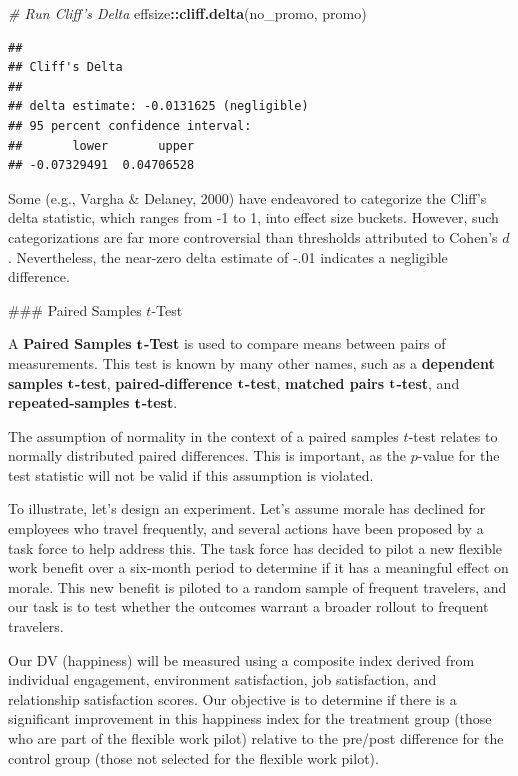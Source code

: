 \documentclass[]{book}
\newenvironment{Shaded}{\begin{snugshade}}{\end{snugshade}}
\newcommand{\CommentTok}[1]{\textcolor[rgb]{0.56,0.35,0.01}{\textit{#1}}}
\newcommand{\KeywordTok}[1]{\textcolor[rgb]{0.13,0.29,0.53}{\textbf{#1}}}
\newcommand{\NormalTok}[1]{#1}
\newcommand{\OperatorTok}[1]{\textcolor[rgb]{0.81,0.36,0.00}{\textbf{#1}}}
\begin{document}
\begin{Shaded}
\begin{Highlighting}[]
\CommentTok{# Run Cliff's Delta}
\NormalTok{effsize}\OperatorTok{::}\KeywordTok{cliff.delta}\NormalTok{(no_promo, promo)}
\end{Highlighting}
\end{Shaded}

\begin{verbatim}
## 
## Cliff's Delta
## 
## delta estimate: -0.0131625 (negligible)
## 95 percent confidence interval:
##       lower       upper 
## -0.07329491  0.04706528
\end{verbatim}

Some (e.g., Vargha \& Delaney, 2000) have endeavored to categorize the Cliff's delta statistic, which ranges from -1 to 1, into effect size buckets. However, such categorizations are far more controversial than thresholds attributed to Cohen's \(d\). Nevertheless, the near-zero delta estimate of -.01 indicates a negligible difference.

\#\#\# Paired Samples \(t\)-Test

A \textbf{Paired Samples }\(\textbf t\)\textbf{-Test} is used to compare means between pairs of measurements. This test is known by many other names, such as a \textbf{dependent samples} \(\textbf t\)\textbf{-test}, \textbf{paired-difference} \(\textbf t\)\textbf{-test}, \textbf{matched pairs} \(\textbf t\)\textbf{-test}, and \textbf{repeated-samples} \(\textbf t\)\textbf{-test}.

The assumption of normality in the context of a paired samples \(t\)-test relates to normally distributed paired differences. This is important, as the \(p\)-value for the test statistic will not be valid if this assumption is violated.

To illustrate, let's design an experiment. Let's assume morale has declined for employees who travel frequently, and several actions have been proposed by a task force to help address this. The task force has decided to pilot a new flexible work benefit over a six-month period to determine if it has a meaningful effect on morale. This new benefit is piloted to a random sample of frequent travelers, and our task is to test whether the outcomes warrant a broader rollout to frequent travelers.

Our DV (happiness) will be measured using a composite index derived from individual engagement, environment satisfaction, job satisfaction, and relationship satisfaction scores. Our objective is to determine if there is a significant improvement in this happiness index for the treatment group (those who are part of the flexible work pilot) relative to the pre/post difference for the control group (those not selected for the flexible work pilot).
\end{document}
